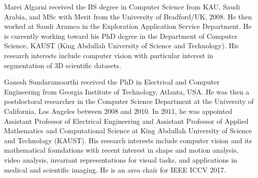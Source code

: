 \documentclass[10pt,journal,compsoc]{IEEEtran}
\begin{document}



\begin{IEEEbiography}{Marei Algarni}
  received the BS degree in Computer Science from KAU, Saudi Arabia,
  and MSc with Merit from the University of Bradford/UK, 2008. He then
  worked at Saudi Aramco in the Exploration Application Service
  Department. He is currently working toward his PhD degree in the
  Department of Computer Science, KAUST (King Abdullah University of
  Science and Technology). His research interests include computer
  vision with particular interest in segmentation of 3D scientific
  datasets.
\end{IEEEbiography}

\begin{IEEEbiography}{Ganesh Sundaramoorthi}
  received the PhD in Electrical and Computer Engineering from Georgia
  Institute of Technology, Atlanta, USA. He was then a postdoctoral
  researcher in the Computer Science Department at the University of
  California, Los Angeles between 2008 and 2010. In 2011, he was
  appointed Assistant Professor of Electrical Engineering and
  Assistant Professor of Applied Mathematics and Computational Science
  at King Abdullah University of Science and Technology (KAUST). His
  research interests include computer vision and its mathematical
  foundations with recent interest in shape and motion analysis, video
  analysis, invariant representations for visual tasks, and
  applications in medical and scientific imaging. He is an area chair for
  IEEE ICCV 2017.
\end{IEEEbiography}

\end{document}
